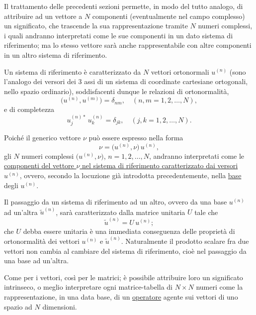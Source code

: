\documentclass[11pt, a4paper]{book}
\numberwithin{equation}{section}
\begin{document}
Il trattamento delle precedenti sezioni permette, in modo del tutto
analogo, di attribuire ad un vettore a $N$ componenti (eventualmente nel
campo complesso) un significato, che trascende la sua rappresentazione
tramite $N$ numeri complessi, i quali andranno interpretati come le sue
componenti in un dato sistema di riferimento; ma lo stesso vettore sarà
anche rappresentabile con altre componenti in un altro sistema di
riferimento.

Un sistema di riferimento è caratterizzato da $N$ vettori ortonormali
$u^{(n)}$ (sono l'analogo dei versori dei 3 assi di un sistema di
coordinate cartesiane ortogonali, nello spazio ordinario), soddisfacenti
dunque le relazioni di ortonormalità,
\begin{equation}
\bigl(u^{(n)}, u^{(m)}\bigr) = \delta_{nm}, \quad (n,m = 1,2,\ldots,N),
\end{equation}
e di completezza
\begin{equation}
u_j^{(n)*}\,u_k^{(n)} = \delta_{jk}, \quad (j,k = 1,2,\ldots,N).
\end{equation}


Poiché il generico vettore $\nu$ può essere espresso nella forma
\begin{equation}
\nu = \bigl(u^{(n)}, \nu\bigr)\,u^{(n)},
\end{equation}
gli $N$ numeri complessi $\bigl(u^{(n)}, \nu\bigr)$, $n=1,2,\ldots,N$,
andranno interpretati come le \uline{componenti del vettore $\nu$ nel
sistema di riferimento caratterizzato dai versori $u^{(n)}$}, ovvero,
secondo la locuzione già introdotta precedentemente, nella \underline{base}
degli $u^{(n)}$.

Il passaggio da un sistema di riferimento ad un altro, ovvero da una base
$u^{(n)}$ ad un'altra $\widetilde{u}^{(n)}$, sarà caratterizzato dalla
matrice unitaria $U$ tale che
\begin{equation}
\widetilde{u}^{(n)} = U\,u^{(n)};
\end{equation}
che $U$ debba essere unitaria è una immediata conseguenza delle proprietà di
ortonormalità dei vettori $u^{(n)}$ e $\widetilde{u}^{(n)}$. Naturalmente
il prodotto scalare fra due vettori non cambia al cambiare del sistema di
riferimento, cioè nel passaggio da una base ad un'altra.

Come per i vettori, così per le matrici; è possibile attribuire loro un
significato intrinseco, o meglio interpretare ogni matrice-tabella di $N
\times N$ numeri come la rappresentazione, in una data base, di un
\underline{operatore} agente sui vettori di uno spazio ad $N$ dimensioni.
\end{document}
